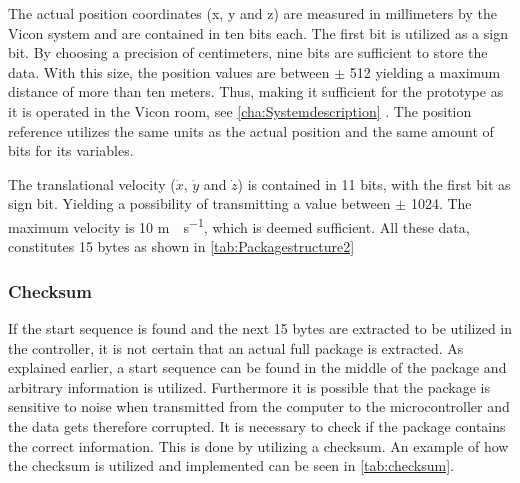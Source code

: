 The actual position coordinates (x, y and z) are measured in millimeters by the Vicon system and are contained in ten bits each. The first bit is utilized as a sign bit. By choosing a precision of centimeters, nine bits are sufficient to store the data. With this size, the position values are between $\pm$ 512 yielding a maximum distance of more than ten meters. Thus, making it sufficient for the prototype as it is operated in the Vicon room, see \autoref{cha:Systemdescription} . The position reference utilizes the same units as the actual position and the same amount of bits for its variables.

The translational velocity ($\dot{x}$, $\dot{y}$ and $\dot{z}$) is contained in 11 bits, with the first bit as sign bit. Yielding a possibility of transmitting a value between $\pm$ 1024. The maximum velocity is 10 \si{m \cdot s^{-1}}, which is deemed sufficient. All these data, constitutes 15 bytes as shown in \autoref{tab:Packagestructure2}

\subsubsection{Checksum}
If the start sequence is found and the next 15 bytes are extracted to be utilized in the controller, it is not certain that an actual full package is extracted. As explained earlier, a start sequence can be found in the middle of the package and arbitrary information is utilized. Furthermore it is possible that the package is sensitive to noise when transmitted from the computer to the microcontroller and the data gets therefore corrupted. It is necessary to check if the package contains the correct information. This is done by utilizing a checksum. An example of how the checksum is utilized and implemented can be seen in \autoref{tab:checksum}.  

